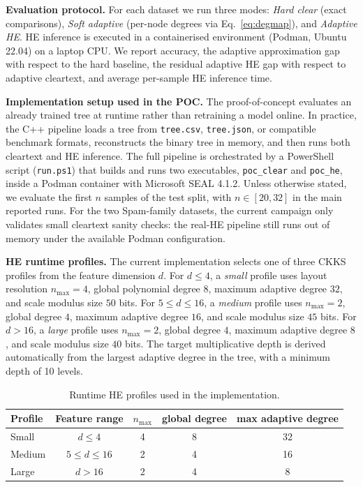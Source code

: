 \documentclass[runningheads]{llncs}
\begin{document}
\textbf{Evaluation protocol.}  For each dataset we run three modes:
\emph{Hard clear} (exact comparisons), \emph{Soft adaptive} (per-node
degrees via Eq.~\eqref{eq:degmap}), and \emph{Adaptive HE}.  HE inference is
executed in a containerised environment (Podman, Ubuntu 22.04) on a laptop
CPU.  We report accuracy, the adaptive approximation gap with respect to the
hard baseline, the residual adaptive HE gap with respect to adaptive
cleartext, and average per-sample HE inference time.

\textbf{Implementation setup used in the POC.}  The proof-of-concept
evaluates an already trained tree at runtime rather than retraining a model
online.  In practice, the C++ pipeline loads a tree from \texttt{tree.csv},
\texttt{tree.json}, or compatible benchmark formats, reconstructs the binary
tree in memory, and then runs both cleartext and HE inference.  The full
pipeline is orchestrated by a PowerShell script (\texttt{run.ps1}) that
builds and runs two executables, \texttt{poc\_clear} and \texttt{poc\_he},
inside a Podman container with Microsoft SEAL 4.1.2.  Unless otherwise
stated, we evaluate the first $n$ samples of the test split, with
$n \in [20,32]$ in the main reported runs.  For the two Spam-family
datasets, the current campaign only validates small cleartext sanity checks:
the real-HE pipeline still runs out of memory under the available Podman
configuration.

\textbf{HE runtime profiles.}  The current implementation selects one of
three CKKS profiles from the feature dimension $d$.  For $d \leq 4$, a
\emph{small} profile uses layout resolution $n_{\max}=4$, global polynomial
degree $8$, maximum adaptive degree $32$, and scale modulus size $50$ bits.
For $5 \leq d \leq 16$, a \emph{medium} profile uses $n_{\max}=2$, global
degree $4$, maximum adaptive degree $16$, and scale modulus size $45$ bits.
For $d > 16$, a \emph{large} profile uses $n_{\max}=2$, global degree $4$,
maximum adaptive degree $8$, and scale modulus size $40$ bits.  The target
multiplicative depth is derived automatically from the largest adaptive
degree in the tree, with a minimum depth of 10 levels.

\begin{table}[t]
\centering
\caption{Runtime HE profiles used in the implementation.}
\label{tab:he_profiles}
\begin{tabular}{@{}l c c c c@{}}
\toprule
Profile & Feature range & $n_{\max}$ & global degree & max adaptive degree \\
\midrule
Small  & $d \leq 4$ & 4 & 8 & 32 \\
Medium & $5 \leq d \leq 16$ & 2 & 4 & 16 \\
Large  & $d > 16$ & 2 & 4 & 8 \\
\bottomrule
\end{tabular}
\end{table}
\end{document}
